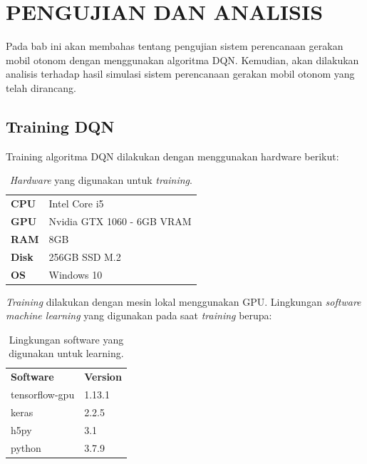 \chapter{PENGUJIAN DAN ANALISIS}
\label{chap:pengujiananalisis}


Pada bab ini akan membahas tentang pengujian sistem perencanaan gerakan mobil otonom dengan menggunakan algoritma DQN. Kemudian, akan dilakukan analisis terhadap hasil simulasi sistem
perencanaan gerakan mobil otonom yang telah dirancang.

\section{Training DQN}
\label{sec:training_dqn}
Training algoritma DQN dilakukan dengan menggunakan hardware berikut:
\begin{table}[H]
	\begin{tabular}{ll}
		\textbf{CPU}  & Intel Core i5              \\
		\textbf{GPU}  & Nvidia GTX 1060 - 6GB VRAM \\
		\textbf{RAM}  & 8GB                        \\
		\textbf{Disk} & 256GB SSD M.2              \\
		\textbf{OS}   & Windows 10                
	\end{tabular}
\caption{\textit{Hardware} yang digunakan untuk \textit{training}.}
\label{tb:hardwaresetup}
\end{table}

\textit{Training} dilakukan dengan mesin lokal menggunakan GPU. Lingkungan \textit{software} \textit{machine learning} yang digunakan pada saat \textit{training }berupa:

\begin{table}[H]
	\begin{tabular}{ll}
		\textbf{Software}  & \textbf{Version}              \\
		tensorflow-gpu  & 1.13.1	\\
		keras  & 2.2.5					\\
		h5py & 3.1              \\
		python & 3.7.9              \\
	\end{tabular}
	\caption{Lingkungan software yang digunakan untuk learning.}
	\label{tb:softwaresetup}
\end{table}


